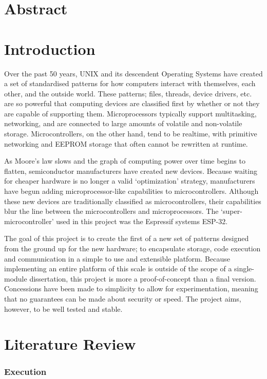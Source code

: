 \documentclass{article}
\begin{document}
\section{Abstract}

\tableofcontents
\section{Introduction}
Over the past 50 years, UNIX and its descendent Operating Systems have created a set of standardised patterns for how computers interact with themselves, each other, and the outside world.
These patterns; files, threads, device drivers, etc. are so powerful that computing devices are classified first by whether or not they are capable of supporting them.
Microprocessors typically support multitasking, networking, and are connected to large amounts of volatile and non-volatile storage.
Microcontrollers, on the other hand, tend to be realtime, with primitive networking and EEPROM storage that often cannot be rewritten at runtime.

As Moore's law slows and the graph of computing power over time begins to flatten, semiconductor manufacturers have created new devices.
Because waiting for cheaper hardware is no longer a valid \lq optimization' strategy, manufacturers have begun adding microprocessor-like capabilities to microcontrollers.
Although these new devices are traditionally classified as microcontrollers, their capabilities blur the line between the microcontrollers and microprocessors.
The \lq super-microcontroller' used in this project was the Espressif systems ESP-32.

The goal of this project is to create the first of a new set of patterns designed from the ground up for the new hardware; to encapsulate storage, code execution and communication in a simple to use and extensible platform.
Because implementing an entire platform of this scale is outside of the scope of a single-module dissertation, this project is more a proof-of-concept than a final version.
Concessions have been made to simplicity to allow for experimentation, meaning that no guarantees can be made about security or speed.
The project aims, however, to be well tested and stable.

\pagebreak
\section{Literature Review}
\subsubsection{Execution}
\end{document}
